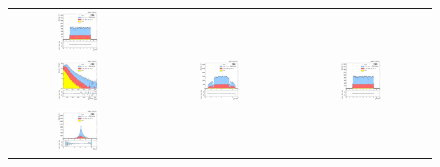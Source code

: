 \begin{figure}[ht]
\begin{center}
\begin{tabular}{ccc}
      \includegraphics[width=0.32\textwidth]{figures/Zprime/2016/complementary/h_led_phi.png}\\
      \includegraphics[width=0.32\textwidth]{figures/Zprime/2016/complementary/h_sub_Et.png}&
      \includegraphics[width=0.32\textwidth]{figures/Zprime/2016/complementary/h_sub_eta.png}&
      \includegraphics[width=0.32\textwidth]{figures/Zprime/2016/complementary/h_sub_phi.png}\\
      \includegraphics[width=0.32\textwidth]{figures/Zprime/2016/complementary/h_DR_ll.png}&

\end{tabular}
\end{center}
\end{figure}
